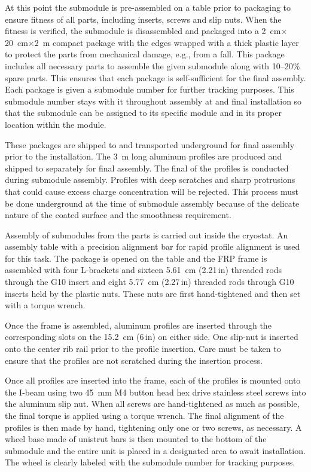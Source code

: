 At this point the submodule is pre-assembled on a table prior to packaging to ensure fitness of all parts, including inserts, screws and slip nuts.   When the fitness is verified, the submodule is disassembled and packaged into a \SI{2}{\cm}$\times$\SI{20}{\cm}$\times$\SI{2}{\m} compact package with the edges wrapped with a thick plastic layer to protect the parts from mechanical damage, e.g., from a fall.  This package includes all necessary parts to assemble the given submodule 
along with \numrange{10}{20}\% spare parts.  This ensures that each package is self-sufficient for the final assembly.  Each package is given a submodule number for further tracking purposes.  This submodule number stays with it throughout assembly at \surf and final installation so that the submodule can be assigned to its specific module and in its proper location within the module. 

These packages are shipped to \surf and transported underground 
for final assembly prior to the installation.   
The \SI{3}{\m} long aluminum profiles are produced and shipped to \surf separately for final assembly.  The final  of the profiles is conducted during submodule assembly.   Profiles with deep scratches and sharp protrusions that could cause excess charge concentration will be rejected. This process must be done underground at the time of submodule assembly because of the delicate nature of the coated surface and the smoothness requirement. 

Assembly of submodules from the parts is carried out inside the cryostat.   An assembly table with a precision alignment bar for rapid profile alignment is used for this task.   The package is opened on the table and the FRP frame is assembled with four L-brackets and sixteen \SI{5.61}{\cm} (\num{2.21}\,in) threaded rods through the G10 insert and eight \SI{5.77}{\cm} (\num{2.27}\,in) threaded rods through G10 inserts held by the plastic nuts.  These nuts are first hand-tightened and then set with a torque wrench. 

Once the frame is assembled, aluminum profiles are inserted through the corresponding slots on the \SI{15.2}{\cm} (\num{6}\,in) on either side.  One slip-nut 
is inserted onto the center rib rail prior to the profile insertion.  
Care must be taken to ensure that the profiles are not scratched during the insertion process. 

Once all profiles are inserted into the frame, each of the profiles is mounted onto the I-beam using two \SI{45}{\mm} M4 button head hex drive stainless steel screws into the aluminum slip nut. 
When all screws are hand-tightened as much as possible, the final torque is applied using a torque wrench.  The final alignment of the profiles is then made by hand, tightening only one or two screws, as necessary.
A wheel base made of unistrut bars is then mounted to the bottom of the submodule and the entire unit is placed in a designated area to await installation.   The wheel is clearly labeled with the submodule number for tracking purposes.



